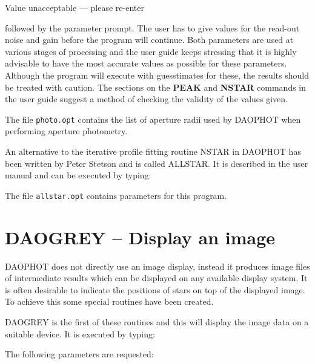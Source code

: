 \documentclass[11pt,nolof]{starlink}
\begin{document}
\begin{terminalv}
Value unacceptable --- please re-enter
\end{terminalv}

followed by the parameter prompt. The user has to give values for the read-out
noise and gain before the program will continue. Both parameters are used at
various stages of processing and the user guide keeps stressing that it is highly
advisable to have the most accurate values as possible for these parameters.
Although the program will execute with guesstimates for these, the results should
be treated with caution. The sections on the \textbf{PEAK} and \textbf{NSTAR} commands in
the user guide suggest a method of checking the validity of the values given.

The file \texttt{photo.opt} contains the list of aperture radii used by DAOPHOT when
performing aperture photometry.

An alternative to the iterative profile fitting routine NSTAR in DAOPHOT has been
written by Peter Stetson and is called ALLSTAR. It is described in the user manual
and can be executed by typing:

\begin{terminalv}
\end{terminalv}

The file \texttt{allstar.opt} contains parameters for this program.

\section{DAOGREY -- Display an image}
\label{sec:daogrey}

DAOPHOT does not directly use an image display, instead it produces image files of
intermediate results which can be displayed on any available display system. It is
often desirable to indicate the positions of stars on top of the displayed image.
To achieve this some special routines have been created.

DAOGREY is the first of these routines and this will display the image data on a
suitable device.
It is executed by typing:

\begin{terminalv}
\end{terminalv}

The following parameters are requested:
\end{document}
